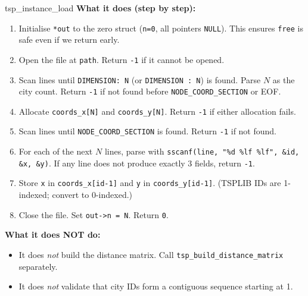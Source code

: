 \documentclass[11pt]{article}
\begin{document}
\begin{apispec}{tsp\_instance\_load}
\textbf{What it does (step by step):}
\begin{enumerate}[label=\arabic*.]
  \item Initialise \texttt{*out} to the zero struct (\texttt{n=0}, all pointers \texttt{NULL}). This ensures \texttt{free} is safe even if we return early.
  \item Open the file at \texttt{path}. Return \texttt{-1} if it cannot be opened.
  \item Scan lines until \texttt{DIMENSION: N} (or \texttt{DIMENSION : N}) is found. Parse $N$ as the city count. Return \texttt{-1} if not found before \texttt{NODE\_COORD\_SECTION} or EOF.
  \item Allocate \texttt{coords\_x[N]} and \texttt{coords\_y[N]}. Return \texttt{-1} if either allocation fails.
  \item Scan lines until \texttt{NODE\_COORD\_SECTION} is found. Return \texttt{-1} if not found.
  \item For each of the next $N$ lines, parse with \texttt{sscanf(line, "\%d \%lf \%lf", \&id, \&x, \&y)}. If any line does not produce exactly 3 fields, return \texttt{-1}.
  \item Store \texttt{x} in \texttt{coords\_x[id-1]} and \texttt{y} in \texttt{coords\_y[id-1]}. (TSPLIB IDs are 1-indexed; convert to 0-indexed.)
  \item Close the file. Set \texttt{out->n = N}. Return \texttt{0}.
\end{enumerate}

\textbf{What it does NOT do:}
\begin{itemize}
  \item It does \emph{not} build the distance matrix. Call \texttt{tsp\_build\_distance\_matrix} separately.
  \item It does \emph{not} validate that city IDs form a contiguous sequence starting at 1.
\end{itemize}

\end{apispec}

\vspace{8pt}
\end{document}
